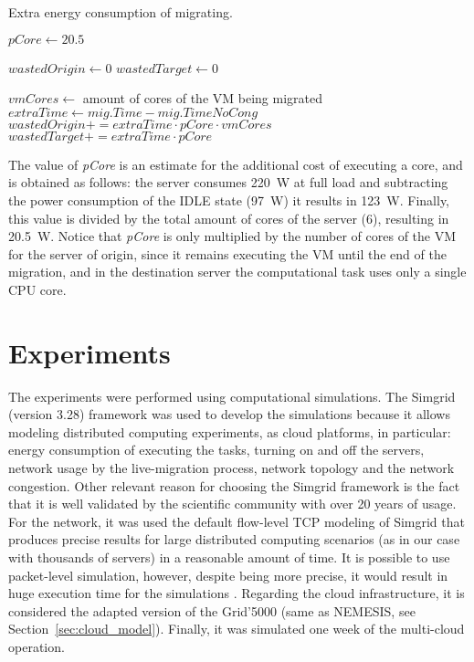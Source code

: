 \begin{algorithm}
\begin{algorithmic}
\caption{Extra energy consumption of migrating.}\label{alg:wasted_energy}

\State $pCore \gets 20.5$

\State $wastedOrigin \gets 0$
\State $wastedTarget \gets 0$

    \State $vmCores \gets$ amount of cores of the VM being migrated
    \State $extraTime \gets mig.Time - mig.TimeNoCong$
        \State $wastedOrigin += extraTime \cdot pCore \cdot vmCores$ 
        \State $wastedTarget += extraTime \cdot pCore$ 
    \EndIf
\EndFor
\end{algorithmic}
\end{algorithm}

The value of \textit{pCore} is an estimate for the additional cost of executing a core, and is
obtained as follows: the server consumes \SI{220}{\watt} at full load and subtracting the power consumption of the IDLE state
(\SI{97}{\watt}) it results in \SI{123}{\watt}. Finally, this
value is divided by the total amount of cores of the server (6),
resulting in \SI{20.5}{\watt}. Notice that
\textit{pCore} is only multiplied by the number of cores of the VM for the server of
origin, since it remains executing the VM until the end of the migration, and in the destination server the computational task uses only a single CPU core.


\section{Experiments}
\label{sec:simulations_smargreens}

The experiments were performed using computational simulations. The Simgrid \cite{CASANOVA20142899} 
(version 3.28) framework was used to develop the simulations because it allows modeling distributed computing
experiments, as cloud platforms, in particular: energy consumption of executing the tasks, turning on and off the servers, network usage by the live-migration process, network topology and the network congestion. Other relevant reason for choosing the Simgrid framework is the fact that it is well validated by the scientific community with over 20 years of usage. For the network, it was used the default flow-level TCP modeling of Simgrid that produces precise results for large distributed computing scenarios (as in our case with thousands of servers) in a reasonable amount of time. It is possible to use packet-level simulation, however, despite being more precise, it would result in huge execution time for the simulations \cite{velho2013simgridparameters}. Regarding the cloud infrastructure, it is considered the adapted version of the Grid'5000 (same as NEMESIS, see Section~\ref{sec:cloud_model}). Finally, it was simulated one week of the multi-cloud operation.

